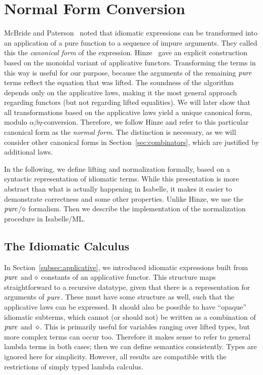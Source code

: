 \chapter{Normal Form Conversion}\label{sec:normal-form}

McBride and Paterson~\cite{mcbride08} noted that idiomatic expressions can
be transformed into an application of a pure function to a sequence of impure
arguments.
They called this the \emph{canonical form} of the expression.
Hinze~\cite[Section~3.3]{hinze10} gave an explicit construction based on the
monoidal variant of applicative functors.  %
Transforming the terms in this way is useful for our purpose, because the
arguments of the remaining $\operatorname{\mathit{pure}}$ terms reflect the equation that was lifted.
The soundness of the algorithm depends only on the applicative laws, making it
the most general approach regarding functors (but not regarding lifted
equalities).
We will later show that all transformations based on the applicative laws yield
a unique canonical form, modulo $\alpha\beta\eta$-conversion.
Therefore, we follow Hinze and refer to this particular canonical form as
the \emph{normal form}.
The distinction is necessary, as we will consider other canonical forms in
Section~\ref{sec:combinators}, which are justified by additional laws.

In the following, we define lifting and normalization formally, based on a
syntactic representation of idiomatic terms.
While this presentation is more abstract than what is actually happening in
Isabelle, it makes it easier to demonstrate correctness and some other
properties.
Unlike Hinze, we use the $\operatorname{\mathit{pure}}$/$\diamond$ formalism.
Then we describe the implementation of the normalization procedure in
Isabelle/ML.

\section{The Idiomatic Calculus}\label{subsec:idiomatic-calculus}

In Section~\ref{subsec:applicative}, we introduced idiomatic expressions built
from $\operatorname{\mathit{pure}}$ and $\diamond$ constants of an applicative functor.
This structure maps straightforward to a recursive datatype, given that there
is a representation for arguments of $\operatorname{\mathit{pure}}$.
These must have some structure as well, such that the applicative laws can be
expressed.
It should also be possible to have ``opaque'' idiomatic subterms, which cannot
(or should not) be written as a combination of $\operatorname{\mathit{pure}}$ and~$\diamond$.
This is primarily useful for variables ranging over lifted types, but more
complex terms can occur too.
Therefore it makes sense to refer to general lambda terms in both cases;
then we can define semantics consistently.
Types are ignored here for simplicity.
However, all results are compatible with the restrictions of simply typed
lambda calculus.

